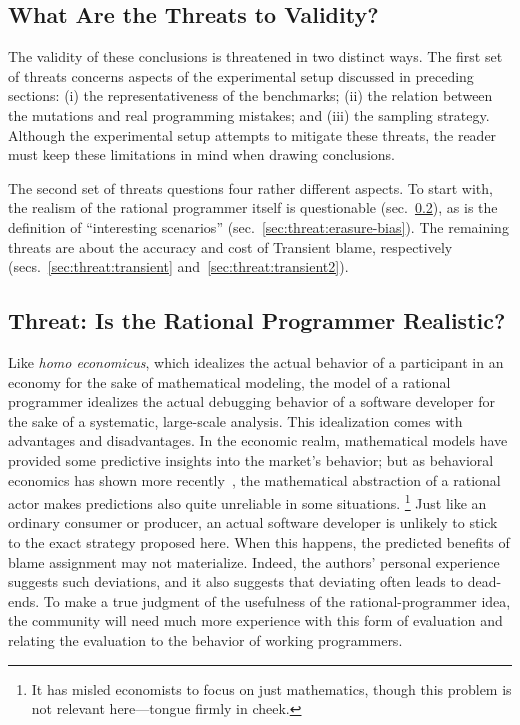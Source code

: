 \subsection{What Are the Threats to Validity?}

The validity of these conclusions is threatened in two distinct ways. The first
set of threats concerns aspects of the experimental setup discussed in preceding
sections: (i) the representativeness of the benchmarks; (ii) the relation between the
mutations and real programming mistakes; and (iii) the sampling strategy.
Although the experimental setup attempts to mitigate these threats, the
reader must keep these limitations in mind when drawing conclusions.

The second set of threats questions four rather different aspects. To start
with, the realism of the rational programmer itself is questionable
(sec.~\ref{sub:rational}), as is the definition of ``interesting scenarios''
(sec.~\ref{sec:threat:erasure-bias}).  The remaining threats are about the
accuracy and cost of Transient blame, respectively
(secs.~\ref{sec:threat:transient} and~\ref{sec:threat:transient2}).

\subsection{Threat: Is the Rational Programmer Realistic?} \label{sub:rational}

Like {\em homo economicus\/}, which idealizes the actual behavior of a
participant in an economy for the sake of mathematical modeling, the model of a
rational programmer idealizes the actual debugging behavior of a software
developer for the sake of a systematic, large-scale analysis. This idealization 
comes with advantages and disadvantages. In the economic realm, mathematical
models have provided some predictive insights into the market's behavior; but as
behavioral economics has shown more recently~\cite{henrich2001search},
the mathematical abstraction of a
rational actor makes predictions also quite unreliable in some situations.
\footnote{It has misled economists to focus on just mathematics, though
this problem is not relevant here---tongue firmly in cheek.}  Just like an
ordinary consumer or producer, an actual software developer is unlikely to stick
to the exact strategy proposed here. When this happens, the predicted benefits
of blame assignment may not materialize. Indeed, the authors' personal
experience suggests such deviations, and it also suggests that deviating often leads to dead-ends.
To make a true judgment of the usefulness of the rational-programmer
idea, the community will need much more experience with this form of evaluation
and relating the evaluation to the behavior of working programmers.

